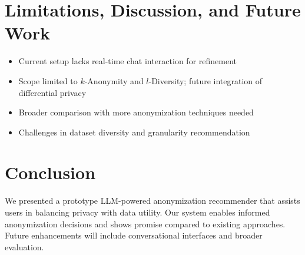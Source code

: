 \documentclass{article}
\begin{document}
\section{Limitations, Discussion, and Future Work}
\begin{itemize}
    \item Current setup lacks real-time chat interaction for refinement
    \item Scope limited to $k$-Anonymity and $l$-Diversity; future integration of differential privacy
    \item Broader comparison with more anonymization techniques needed
    \item Challenges in dataset diversity and granularity recommendation
\end{itemize}

\section{Conclusion}
We presented a prototype LLM-powered anonymization recommender that assists users in balancing privacy with data utility. Our system enables informed anonymization decisions and shows promise compared to existing approaches. Future enhancements will include conversational interfaces and broader evaluation.
\end{document}
